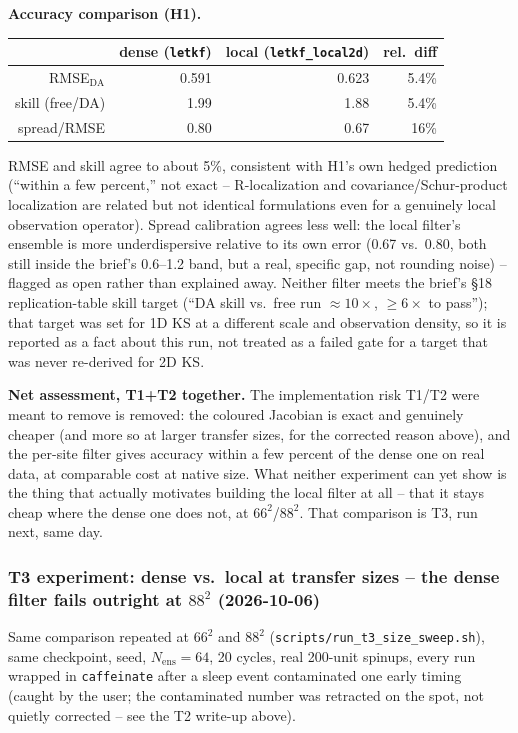 \documentclass[11pt]{article}
\begin{document}
\textbf{Accuracy comparison (H1).}
\begin{center}
\begin{tabular}{rrrr}
\toprule
 & dense (\texttt{letkf}) & local (\texttt{letkf\_local2d}) & rel.\ diff \\
\midrule
RMSE$_{\mathrm{DA}}$ & 0.591 & 0.623 & 5.4\% \\
skill (free/DA)      & 1.99  & 1.88  & 5.4\% \\
spread/RMSE          & 0.80  & 0.67  & 16\% \\
\bottomrule
\end{tabular}
\end{center}
RMSE and skill agree to about 5\%, consistent with H1's own hedged
prediction (``within a few percent,'' not exact -- R-localization and
covariance/Schur-product localization are related but not identical
formulations even for a genuinely local observation operator). Spread
calibration agrees less well: the local filter's ensemble is more
underdispersive relative to its own error (0.67 vs.\ 0.80, both still
inside the brief's 0.6--1.2 band, but a real, specific gap, not
rounding noise) -- flagged as open rather than explained away. Neither
filter meets the brief's \S18 replication-table skill target (``DA
skill vs.\ free run $\approx10\times$, $\ge6\times$ to pass''); that
target was set for 1D KS at a different scale and observation density,
so it is reported as a fact about this run, not treated as a failed
gate for a target that was never re-derived for 2D KS.

\textbf{Net assessment, T1+T2 together.} The implementation risk T1/T2
were meant to remove is removed: the coloured Jacobian is exact and
genuinely cheaper (and more so at larger transfer sizes, for the
corrected reason above), and the per-site filter gives accuracy within
a few percent of the dense one on real data, at comparable cost at
native size. What neither experiment can yet show is the thing that
actually motivates building the local filter at all -- that it stays
cheap where the dense one does not, at $66^2$/$88^2$. That comparison
is T3, run next, same day.

\subsubsection*{T3 experiment: dense vs.\ local at transfer sizes --
the dense filter fails outright at $88^2$ (2026-10-06)}
Same comparison repeated at $66^2$ and $88^2$ (\texttt{scripts/run\_t3\_size\_sweep.sh}),
same checkpoint, seed, $N_{\mathrm{ens}}{=}64$, 20 cycles, real 200-unit
spinups, every run wrapped in \texttt{caffeinate} after a sleep event
contaminated one early timing (caught by the user; the contaminated
number was retracted on the spot, not quietly corrected -- see the T2
write-up above).
\end{document}

